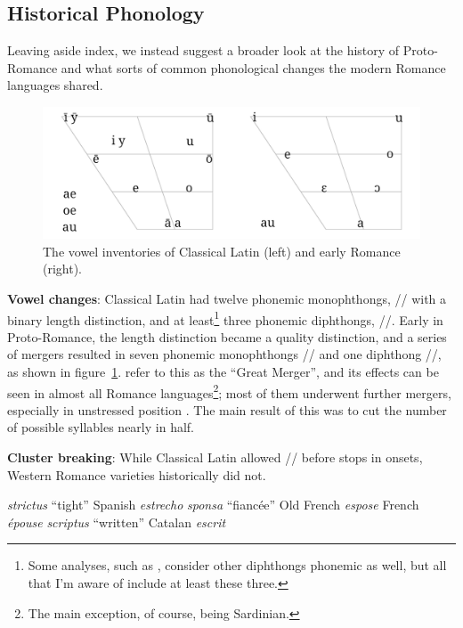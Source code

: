 \documentclass[12pt,twoside]{article}
\newcommand{\ipa}[1]{/\textipa{#1}/}
\newcommand{\yields}{\textrightarrow}
\begin{document}
\subsection{Historical Phonology}

Leaving aside  index, we instead suggest a broader look at the history of Proto-Romance and what sorts of common phonological changes the modern Romance languages shared.

\begin{figure}[h]
\centering
\noindent\includegraphics[width=\linewidth]{vowelchange}
\caption{The vowel inventories of Classical Latin (left) and early Romance (right).}
\label{fig:vowels}
\end{figure}

\textbf{Vowel changes}: Classical Latin had twelve phonemic monophthongs, \ipa{i e a o u} with a binary length distinction, and at least\footnote{Some analyses, such as \citet{allen}, consider other diphthongs phonemic as well, but all that I'm aware of include at least these three.} three phonemic diphthongs, \ipa{a\textsubarch{e} o\textsubarch{e} a\textsubarch{u}}. Early in Proto-Romance, the length distinction became a quality distinction, and a series of mergers resulted in seven phonemic monophthongs \ipa{i e E a O o u} and one diphthong \ipa{a\textsubarch{u}}, as shown in figure~\ref{fig:vowels}. \citet{alkire} refer to this as the ``Great Merger'', and its effects can be seen in almost all Romance languages\footnote{The main exception, of course, being Sardinian.}; most of them underwent further mergers, especially in unstressed position \citep{alkire}. The main result of this was to cut the number of possible syllables nearly in half.

\textbf{Cluster breaking}: While Classical Latin allowed \ipa{s} before stops in onsets, Western Romance varieties historically did not.

\begin{exe}
\ex \emph{strictus} ``tight'' \yields{} Spanish \emph{estrecho}
\ex \emph{sponsa} ``fiancée'' \yields{} Old French \emph{espose} \yields{} French \emph{épouse}
\ex \emph{scriptus} ``written'' \yields{} Catalan \emph{escrit}
\end{exe}
\end{document}
